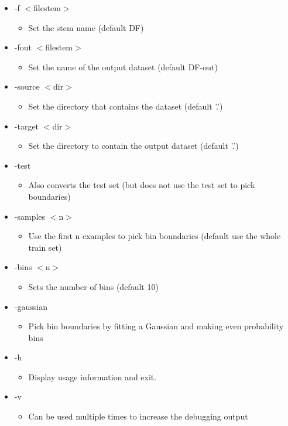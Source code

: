 \begin{itemize}
\item -f $<$filestem$>$\begin{itemize}
\item Set the stem name (default DF)\end{itemize}
\item -fout $<$filestem$>$\begin{itemize}
\item Set the name of the output dataset (default DF-out)\end{itemize}
\item -source $<$dir$>$\begin{itemize}
\item Set the directory that contains the dataset (default '.')\end{itemize}
\item -target $<$dir$>$\begin{itemize}
\item Set the directory to contain the output dataset (default '.')\end{itemize}
\item -test\begin{itemize}
\item Also converts the test set (but does not use the test set to pick boundaries)\end{itemize}
\item -samples $<$n$>$\begin{itemize}
\item Use the first n examples to pick bin boundaries (default use the whole train set)\end{itemize}
\item -bins $<$n$>$\begin{itemize}
\item Sets the number of bins (default 10)\end{itemize}
\item -gaussian\begin{itemize}
\item Pick bin boundaries by fitting a Gaussian and making even probability bins\end{itemize}
\item -h\begin{itemize}
\item Display usage information and exit.\end{itemize}
\item -v\begin{itemize}
\item Can be used multiple times to increase the debugging output\end{itemize}
\end{itemize}


